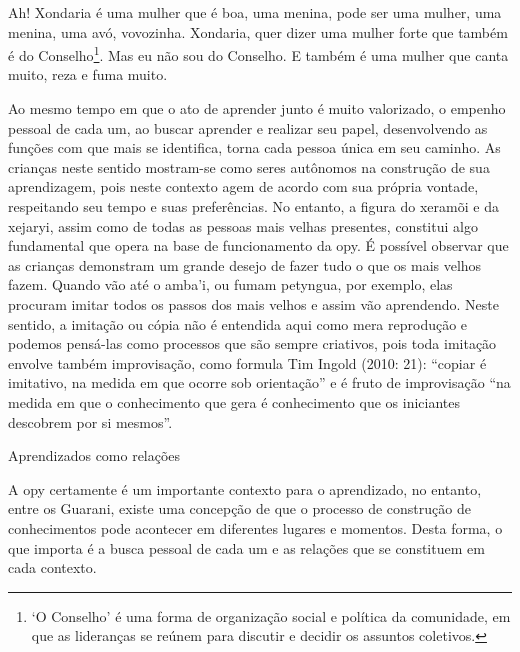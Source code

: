 \documentclass{article}
\begin{document}
Ah! Xondaria \'e uma mulher que \'e boa, uma menina, pode ser uma
mulher, uma menina, uma av\'o, vovozinha. Xondaria, quer dizer uma
mulher forte que tamb\'em \'e do Conselho\footnote{ {\textquoteleft}O
Conselho{\textquoteright} \'e uma forma de organiza\c{c}\~ao social e
pol\'itica da comunidade, em que as lideran\c{c}as se re\'unem para
discutir e decidir os assuntos coletivos. }. Mas eu n\~ao sou do
Conselho. E tamb\'em \'e uma mulher que canta muito, reza e fuma muito.

Ao mesmo tempo em que o ato de aprender junto \'e muito valorizado, o
empenho pessoal de cada um, ao buscar aprender e realizar seu papel,
desenvolvendo as fun\c{c}\~oes com que mais se identifica, torna cada
pessoa \'unica em seu caminho. As crian\c{c}as neste sentido mostram-se
como seres aut\^onomos na constru\c{c}\~ao de sua aprendizagem, pois
neste contexto agem de acordo com sua pr\'opria vontade, respeitando
seu tempo e suas prefer\^encias.  No entanto, a figura do xeram\~oi e
da xejaryi, assim como de todas as pessoas mais velhas presentes,
constitui algo fundamental que opera na base de funcionamento da opy.
\'E poss\'ivel observar que as crian\c{c}as demonstram um grande desejo
de fazer tudo o que os mais velhos fazem. Quando v\~ao at\'e o
amba{\textquoteright}i, ou fumam petyngua, por exemplo, elas procuram
imitar todos os passos dos mais velhos e assim v\~ao aprendendo. Neste
sentido, a imita\c{c}\~ao ou c\'opia n\~ao \'e entendida aqui como mera
reprodu\c{c}\~ao e podemos pens\'a-las como processos que s\~ao sempre
criativos, pois toda imita\c{c}\~ao envolve tamb\'em
improvisa\c{c}\~ao, como formula Tim Ingold (2010: 21):
{\textquotedblleft}copiar \'e imitativo, na medida em que ocorre sob
orienta\c{c}\~ao{\textquotedblright} e \'e fruto de improvisa\c{c}\~ao
{\textquotedblleft}na medida em que o conhecimento que gera \'e
conhecimento que os iniciantes descobrem por si
mesmos{\textquotedblright}.

Aprendizados como rela\c{c}\~oes

A opy certamente \'e um importante contexto para o aprendizado, no
entanto, entre os Guarani, existe uma concep\c{c}\~ao de que o processo
de constru\c{c}\~ao de conhecimentos pode acontecer em diferentes
lugares e momentos. Desta forma, o que importa \'e a busca pessoal de
cada um e as rela\c{c}\~oes que se constituem em cada contexto. 
\end{document}
